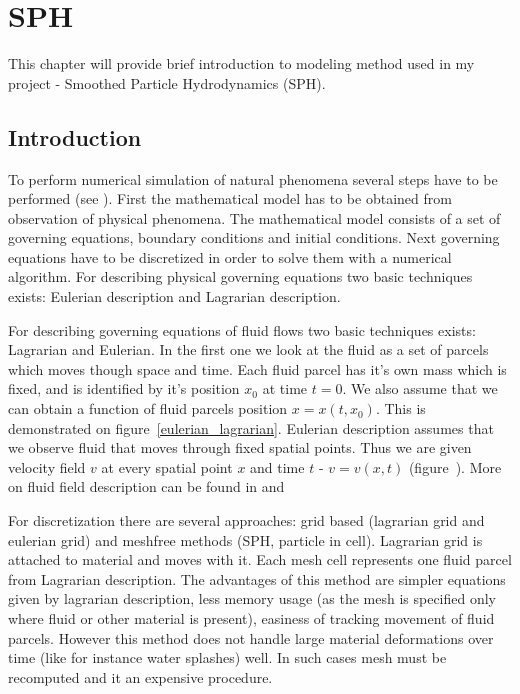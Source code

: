 

\chapter{SPH}


\graphicspath{{sph/figures/}}

This chapter will provide brief introduction to modeling method used in my project - Smoothed Particle Hydrodynamics (SPH).

\section{Introduction}
To perform numerical simulation of natural phenomena several steps have to be performed (see \cite[section 1.1.2]{Liu}). First the mathematical model has to be obtained from observation of physical phenomena. The mathematical model consists of a set of governing equations, boundary conditions and initial conditions. Next governing equations have to be discretized in order to solve them with a numerical algorithm.
For describing physical governing equations two basic techniques exists: Eulerian description and Lagrarian description.

For describing governing equations of fluid flows two basic techniques exists: Lagrarian and Eulerian. In the first one we look at the fluid as a set of parcels which moves though space and time. Each fluid parcel has it's own mass which is fixed, and is identified by it's position $x_0$ at time $t = 0$. We also assume that we can obtain a function of fluid parcels position $x = x(t, x_0)$. This is demonstrated on figure~\ref{eulerian_lagrarian}.
Eulerian description assumes that we observe fluid that moves through fixed spatial points. Thus we are given velocity field $v$ at every spatial point $x$ and time $t$ - $v = v(x, t)$ (figure~\cite{eulerian_lagrarian}). 
More on fluid field description can be found in \cite[section 2.1]{Hauke2008} and \cite{Price06}


For discretization there are several approaches: grid based (lagrarian grid and eulerian grid) and meshfree methods (SPH, particle in cell).
Lagrarian grid is attached to material and moves with it. Each mesh cell represents one fluid parcel from Lagrarian description. The advantages of this method are simpler equations given by lagrarian description, less memory usage (as the mesh is specified only where fluid or other material is present), easiness of tracking movement of fluid parcels. However this method does not handle large material deformations over time (like for instance water splashes) well. In such cases mesh must be recomputed and it an expensive procedure.

